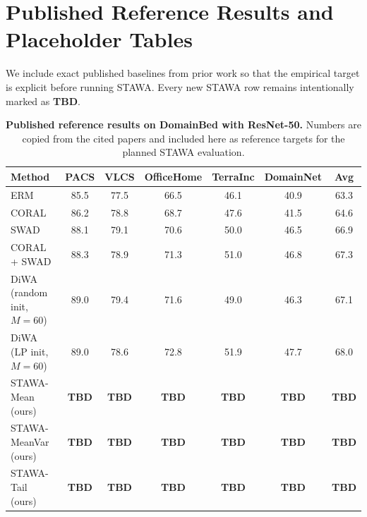 \documentclass{article}
\newcommand{\TBD}{\textbf{TBD}}
\newcommand{\stawa}{\textup{\textsc{STAWA}}}
\newcommand{\swad}{\textup{\textsc{SWAD}}}
\begin{document}
\section{Published Reference Results and Placeholder Tables}
\label{sec:results}

We include exact published baselines from prior work so that the empirical target is explicit before running \stawa{}. Every new \stawa{} row remains intentionally marked as \TBD{}.

\begin{table}[t]
    \centering
    \small
    \setlength{\tabcolsep}{5pt}
    \caption{\textbf{Published reference results on DomainBed with ResNet-50.} Numbers are copied from the cited papers and included here as reference targets for the planned \stawa{} evaluation.}
    \label{tab:published}
    \begin{tabular}{lcccccc}
        \toprule
        Method & PACS & VLCS & OfficeHome & TerraInc & DomainNet & Avg \\
        \midrule
        ERM \citep{cha2021wad,rame2022diwa} & 85.5 & 77.5 & 66.5 & 46.1 & 40.9 & 63.3 \\
        CORAL \citep{rame2022diwa} & 86.2 & 78.8 & 68.7 & 47.6 & 41.5 & 64.6 \\
        \swad{} \citep{cha2021wad} & 88.1 & 79.1 & 70.6 & 50.0 & 46.5 & 66.9 \\
        CORAL + \swad{} \citep{cha2021wad} & 88.3 & 78.9 & 71.3 & 51.0 & 46.8 & 67.3 \\
        DiWA (random init, $M=60$) \citep{rame2022diwa} & 89.0 & 79.4 & 71.6 & 49.0 & 46.3 & 67.1 \\
        DiWA (LP init, $M=60$) \citep{rame2022diwa} & 89.0 & 78.6 & 72.8 & 51.9 & 47.7 & 68.0 \\
        \midrule
        \stawa-Mean (ours) & \TBD & \TBD & \TBD & \TBD & \TBD & \TBD \\
        \stawa-MeanVar (ours) & \TBD & \TBD & \TBD & \TBD & \TBD & \TBD \\
        \stawa-Tail (ours) & \TBD & \TBD & \TBD & \TBD & \TBD & \TBD \\
        \bottomrule
    \end{tabular}
\end{table}
\end{document}

